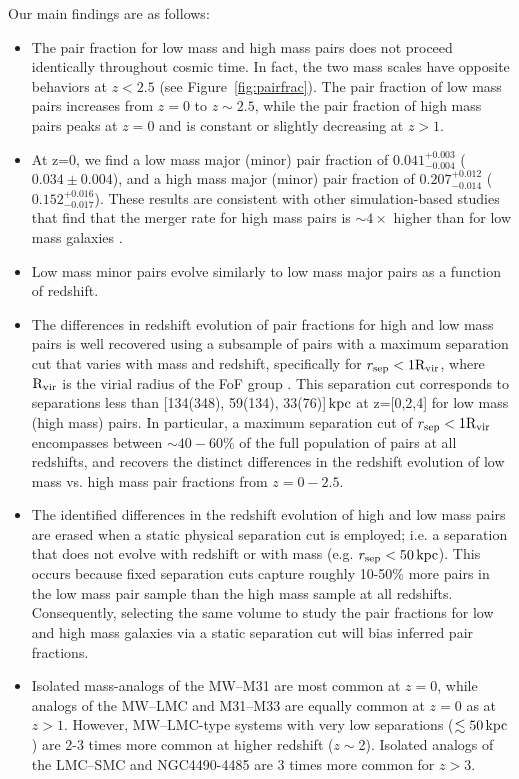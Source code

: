 \documentclass[twocolumn]{aastex631}
\newcommand{\Rvir}{\ensuremath{\rm R_{vir}}}
\begin{document}
Our main findings are as follows:
\begin{itemize}
    \item The pair fraction for low mass and high mass pairs does not proceed identically throughout cosmic time.
    In fact, the two mass scales have opposite behaviors at $z<2.5$ (see Figure~\ref{fig:pairfrac}).
    The pair fraction of low mass pairs increases from $z=0$ to $z\sim2.5$, while the pair fraction of high mass pairs peaks at $z=0$ and is constant or slightly decreasing at $z>1$.
    \item At z=0, we find a low mass major (minor) pair fraction of $0.041^{+0.003}_{-0.004}$ ($0.034\pm0.004$), and a high mass major (minor) pair fraction of $0.207^{+0.012}_{-0.014}$ ($0.152^{+0.016}_{-0.017}$). 
    These results are consistent with other simulation-based studies that find that the merger rate for high mass pairs is $\sim4\times$ higher than for low mass galaxies \citep[e.g.][]{RG2015}. 
    \item Low mass minor pairs evolve similarly to low mass major pairs as a function of redshift.
    \item The differences in redshift evolution of pair fractions for high and low mass pairs is well recovered using a subsample of pairs with a maximum separation cut that varies with mass and redshift, specifically for $r_{\mathrm{sep}}<1\Rvir$, where $\Rvir$ is the virial radius of the FoF group
    .
    This separation cut corresponds to separations less than [134(348), 59(134), 33(76)]$\mathrm{\,kpc}$ at z=[0,2,4] for low mass (high mass) pairs.
    In particular, a maximum separation cut of $r_{\mathrm{sep}}<1\Rvir$ encompasses between $\sim40-60\%$ of the full population of pairs at all redshifts, and recovers the distinct differences in the redshift evolution of low mass vs. high mass pair fractions from $z=0-2.5$. 
    \item The identified differences in the redshift evolution of high and low mass pairs are erased when a static physical separation cut is employed; i.e. a separation that does not evolve with redshift or with mass (e.g. $r_{\mathrm{sep}}<50\mathrm{\,kpc}$). 
    This occurs because fixed separation cuts capture roughly 10-50\% more pairs in the low mass pair sample than the high mass sample at all redshifts.  
    Consequently, selecting the same volume to study the pair fractions for low and high mass galaxies via a static separation cut will bias inferred pair fractions. 
    \item Isolated mass-analogs of the MW--M31 are most common at $z=0$, while analogs of the MW--LMC and M31--M33 are equally common at $z=0$ as at $z>1$. 
    However, MW--LMC-type systems with very low separations ($\lesssim50\mathrm{\,kpc}$) are 2-3 times more common at higher redshift ($z\sim$2). 
    Isolated analogs of the LMC--SMC and  NGC4490-4485 are 3 times more common for $z>3$. 
\end{itemize}
    
\end{document}
